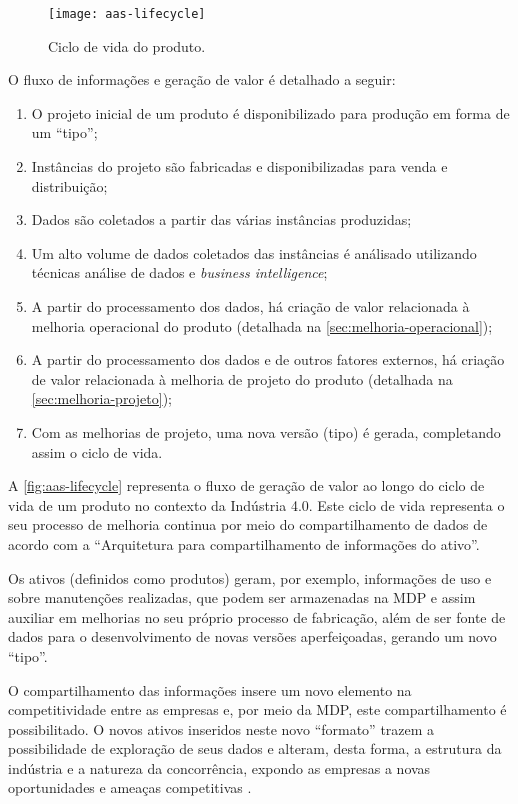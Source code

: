 \begin{figure}[htb!]
	\centering
	\texttt{[image: aas-lifecycle]}
	\caption{Ciclo de vida do produto.}
	\label{fig:aas-lifecycle}
\end{figure}

O fluxo de informações e geração de valor é detalhado a seguir:

\begin{enumerate}[label=(\alph*)]
	\item O projeto inicial de um produto é disponibilizado para produção em forma de um ``tipo'';
	\item Instâncias do projeto são fabricadas e disponibilizadas para venda e distribuição;
	\item Dados são coletados a partir das várias instâncias produzidas;
	\item Um alto volume de dados coletados das instâncias é análisado utilizando técnicas análise de dados e \textit{business intelligence};
	\item A partir do processamento dos dados, há criação de valor relacionada à melhoria operacional do produto (detalhada na \autoref{sec:melhoria-operacional});
	\item A partir do processamento dos dados e de outros fatores externos, há criação de valor relacionada à melhoria de projeto do produto (detalhada na \autoref{sec:melhoria-projeto});
	\item Com as melhorias de projeto, uma nova versão (tipo) é gerada, completando assim o ciclo de vida.
\end{enumerate}

A \autoref{fig:aas-lifecycle} representa o fluxo de geração de valor ao longo do ciclo de vida de um produto no contexto da Indústria 4.0. Este ciclo de vida representa o seu processo de melhoria continua por meio do compartilhamento de dados de acordo com a ``Arquitetura para compartilhamento de informações do ativo''.

Os ativos (definidos como produtos) geram, por exemplo, informações de uso e sobre manutenções realizadas, que podem ser armazenadas na MDP e assim auxiliar em melhorias no seu próprio processo de fabricação, além de ser fonte de dados para o desenvolvimento de novas versões aperfeiçoadas, gerando um novo ``tipo''.

O compartilhamento das informações insere um novo elemento na competitividade entre as empresas \cite{framling2013plm} e, por meio da MDP, este compartilhamento é possibilitado. O novos ativos inseridos neste novo ``formato'' trazem a possibilidade de exploração de seus dados e alteram, desta forma, a estrutura da indústria e a natureza da concorrência, expondo as empresas a novas oportunidades e ameaças competitivas \cite{porter2014smartproducts}.

